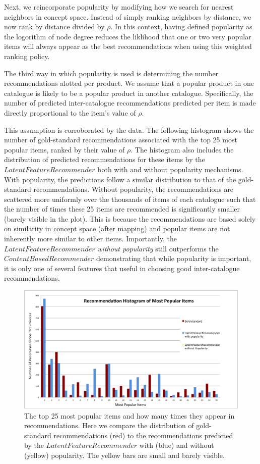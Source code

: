 \documentclass[11pt]{article}
\begin{document}
Next, we reincorporate popularity by modifying how we search for nearest
neighbors in concept space. Instead of simply ranking neighbors by distance, we
now rank by distance divided by $\rho$.  In this context, having defined
popularity as the logorithm of node degree reduces the liklihood that one or two
very popular items will always appear as the best recommendations when using
this weighted ranking policy. 

The third way in which popularity is used is determining the number
recommendations alotted per product. We assume that a popular product in one
catalogue is likely to be a popular product in another catalogue. Specifically,
the number of predicted inter-catalogue recommendations predicted per item is
made directly proportional to the item's value of $\rho$.

This assumption is corroborated by the data. The following histogram shows the
number of gold-standard recommendations associated with the top 25 most popular
items, ranked by their value of $\rho$. The histogram also includes the
distribution of predicted recommendations for these items by the
$LatentFeatureRecommender$ both with and without popularity mechanisms. With
popularity, the predictions follow a similar distribution to that of the
gold-standard recommendations. Without popularity, the recommendations are
scattered more uniformly over the thousands of items of each catalogue such that
the number of times these 25 items are recommended is significantly smaller
(barely visible in the plot). This is because the recommendations are based
solely on similarity in concept space (after mapping) and popular items are not
inherently more similar to other items. Importantly, the
$LatentFeatureRecommender$ {\em without popularity} still outperforms the
$ContentBasedRecommender$ demonstrating that while popularity is important, it
is only one of several features that useful in choosing good inter-catalogue
recommendations.

\begin{figure}[!htbp]
    \centering
    \includegraphics[width=1.0\textwidth]{PopularityHistogram.png}
	\caption{The top 25 most popular items and how many times they appear in
    recommendations. Here we compare the distribution of gold-standard
    recommendations (red) to the recommendations predicted by the
    $LatentFeatureRecommender$ with (blue) and without (yellow) popularity. The
    yellow bars are small and barely visible.}
    \label{fig:PopularityHistogram}
\end{figure}
\end{document}
